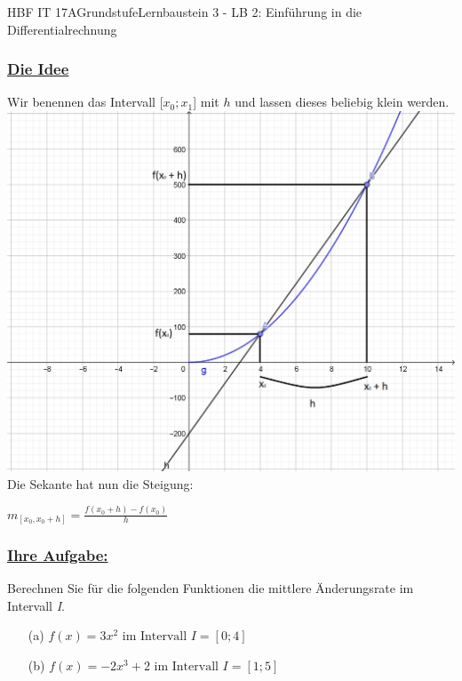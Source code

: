 \documentclass[11pt,twocolumn,oneside,openany,headings=optiontotoc,11pt,numbers=noenddot,final]{article}
\begin{document}
\begin{worksheet}{HBF IT 17A}{Grundstufe}{Lernbaustein 3 - LB 2: Einführung in die Differentialrechnung}
		\subsubsection*{\underline{Die Idee}}
		Wir benennen das Intervall [\(x_{0};x_{1}\)] mit \(h\) und lassen dieses beliebig klein werden.
		\includegraphics[scale=0.25]{Bilder/DifferenzenquotienthMeth.jpg}
		Die Sekante hat nun die Steigung:\\
		\begin{center}
			\(m_{[x_{0},x_{0}+h]} = \frac{f(x_{0}+h) - f(x_{0})}{h}\)
		\end{center}
		\subsubsection*{\underline{Ihre Aufgabe:}}
		Berechnen Sie für die folgenden Funktionen die mittlere Änderungsrate im Intervall \textit{I}.
		\begin{itemize}
			\itemsep0pt
		\item[(a)] \(f(x) = 3x^{2} \text{ im Intervall } I=[0;4]\)
			\item[(b)] \(f(x) = -2x^{3} + 2 \text{ im Intervall } I=[1;5]\)
		\end{itemize}
	\end{worksheet}
\end{document}
